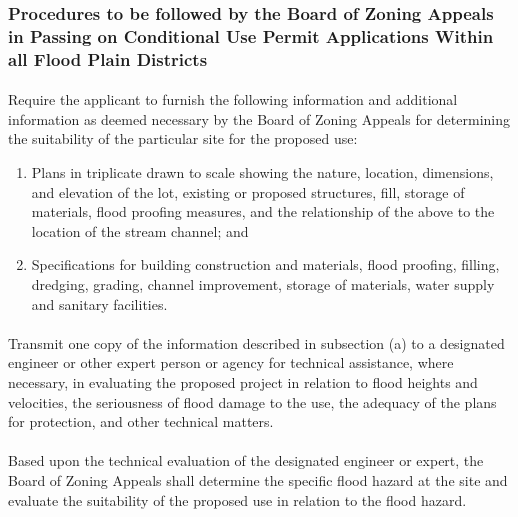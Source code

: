 \subsubsection{Procedures to be followed by the Board of Zoning Appeals in Passing on Conditional Use Permit Applications Within all Flood Plain Districts}
\paragraph{}
Require the applicant to furnish the following information and additional information as deemed necessary by the Board of Zoning Appeals for determining the suitability of the particular site for the proposed use:
\begin{enumerate}[{\indent}1)]
    \item Plans in triplicate drawn to scale showing the nature, location, dimensions, and elevation of the lot, existing or proposed structures, fill, storage of materials, flood proofing measures, and the relationship of the above to the location of the stream channel; and
    \item Specifications for building construction and materials, flood proofing, filling, dredging, grading, channel improvement, storage of materials, water supply and sanitary facilities.
\end{enumerate}
\paragraph{}
Transmit one copy of the information described in subsection (a) to a designated engineer or other expert person or agency for technical assistance, where necessary, in evaluating the proposed project in relation to flood heights and velocities, the seriousness of flood damage to the use, the adequacy of the plans for protection, and other technical matters.
\paragraph{}
Based upon the technical evaluation of the designated engineer or expert, the Board of Zoning Appeals shall determine the specific flood hazard at the site and evaluate the suitability of the proposed use in relation to the flood hazard.
